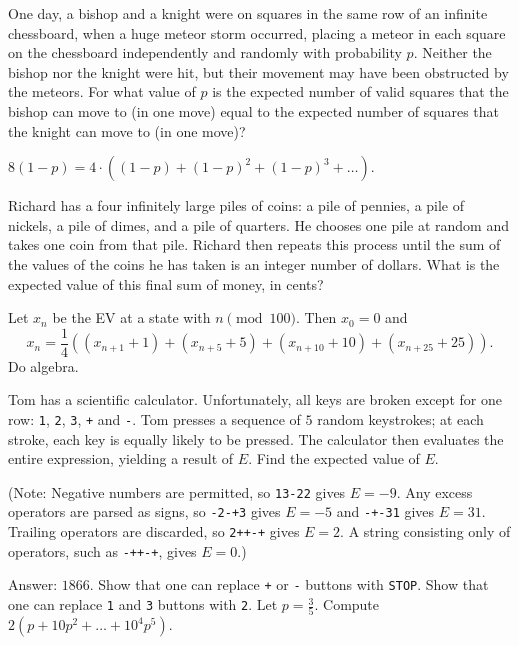 \documentclass[11pt]{scrartcl}
\begin{document}
\begin{problem}[NIMO 4.3]
	One day, a bishop and a knight were on squares in the same row of an infinite chessboard, when a huge meteor storm occurred, placing a meteor in each square on the chessboard independently and randomly with probability $p$. Neither the bishop nor the knight were hit, but their movement may have been obstructed by the meteors.  For what value of $p$ is the expected number of valid squares that the bishop can move to (in one move) equal to the expected number of squares that the knight can move to (in one move)? %
	\begin{sketch}
		$8(1-p) = 4 \cdot \left( (1-p)+(1-p)^2+(1-p)^3+\dots \right)$.
	\end{sketch}
\end{problem}
\begin{problem}[NIMO 7.3]
	Richard has a four infinitely large piles of coins: a pile of pennies, a pile of nickels, a pile of dimes, and a pile of quarters. He chooses one pile at random and takes one coin from that pile. Richard then repeats this process until the sum of the values of the coins he has taken is an integer number of dollars.  What is the expected value of this final sum of money, in cents? %
	\begin{sketch}
		Let $x_n$ be the EV at a state with $n \pmod 100$.
		Then $x_0 = 0$ and \[ x_n = \frac 14 \left( (x_{n+1}+1) + (x_{n+5}+5) + (x_{n+10}+10) + (x_{n+25}+25) \right). \]
		Do algebra.
	\end{sketch}
\end{problem}
\begin{problem}[NIMO 5.6]
	Tom has a scientific calculator. Unfortunately, all keys are broken except for one row: \verb$1$, \verb$2$, \verb$3$, \verb$+$ and \verb$-$.  Tom presses a sequence of $5$ random keystrokes; at each stroke, each key is equally likely to be pressed.  The calculator then evaluates the entire expression, yielding a result of $E$.  Find the expected value of $E$. \par (Note: Negative numbers are permitted, so \verb$13-22$ gives $E = -9$. Any excess operators are parsed as signs, so \verb$-2-+3$ gives $E=-5$ and \verb$-+-31$ gives $E = 31$.  Trailing operators are discarded, so \verb$2++-+$ gives $E=2$.  A string consisting only of operators, such as \verb$-++-+$, gives $E=0$.) %
	\begin{sketch}
		Answer: $1866$.
		Show that one can replace \verb$+$ or \verb$-$ buttons with \verb$STOP$.
		Show that one can replace \verb$1$ and \verb$3$ buttons with \verb$2$.
		Let $p = \frac 35$.  Compute $2(p + 10p^2 + \dots + 10^4p^5)$.
	\end{sketch}
\end{problem}
\end{document}
